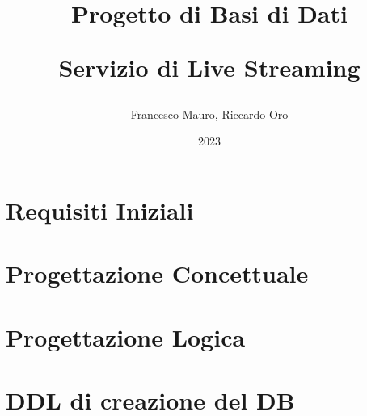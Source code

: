 \documentclass[letterpaper]{report}
\title{ Progetto di Basi di Dati \newline \begin{center}
  \textbf{Servizio di Live Streaming}
\end{center}}
\author{Francesco Mauro, Riccardo Oro}
\date{2023}
\begin{document}
\maketitle
\tableofcontents

\chapter{Requisiti Iniziali}

\chapter{Progettazione Concettuale}




\chapter{Progettazione Logica}



\chapter{DDL di creazione del DB}

\end{document}
